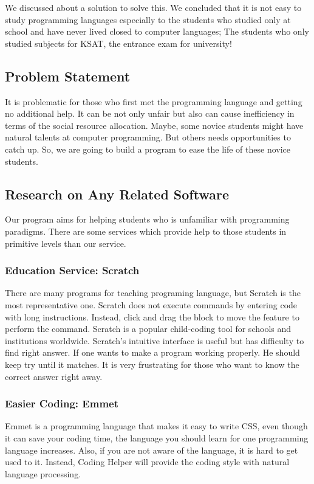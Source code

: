 \documentclass[conference]{IEEEtran}
\begin{document}
We discussed about a solution to solve this. We concluded that it is not easy to study programming languages especially to the students who studied only at school and have never lived closed to computer languages; The students who only studied subjects for KSAT, the entrance exam for university!

\subsection{Problem Statement}
It is problematic for those who first met the programming language and getting no additional help. It can be not only unfair but also can cause inefficiency in terms of the social resource allocation. Maybe, some novice students might have natural talents at computer programming. But others needs opportunities to catch up. So, we are going to build a program to ease the life of these novice students.


\subsection{Research on Any Related Software}
Our program aims for helping students who is unfamiliar with programming paradigms. There are some services which provide help to those students in primitive levels than our service.

\subsubsection{Education Service: Scratch}
There are many programs for teaching programing language, but Scratch is the most representative one. Scratch does not execute commands by entering code with long instructions. Instead, click and drag the block to move the feature to perform the command. Scratch is a popular child-coding tool for schools and institutions worldwide. Scratch's intuitive interface is useful but has difficulty to find right answer. If one wants to make a program working properly. He should keep try until it matches. It is very frustrating for those who want to know the correct answer right away.

\subsubsection{Easier Coding: Emmet}
Emmet is a programming language that makes it easy to write CSS, even though it can save your coding time, the language you should learn for one programming language increases. Also, if you are not aware of the language, it is hard to get used to it. Instead, Coding Helper will provide the coding style with natural language processing.
\end{document}
